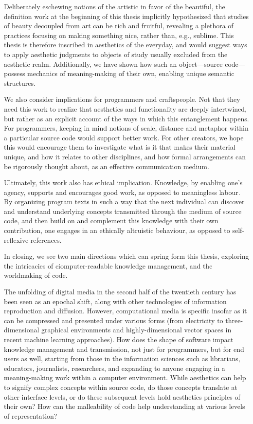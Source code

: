 Deliberately eschewing notions of the artistic in favor of the beautiful, the definition work at the beginning of this thesis implicitly hypothesized that studies of beauty decoupled from art can be rich and fruitful, revealing a plethora of practices focusing on making something nice, rather than, e.g., sublime. This thesis is therefore inscribed in aesthetics of the everyday, and would suggest ways to apply aesthetic judgments to objects of study usually excluded from the aesthetic realm. Additionally, we have shown how such an object—source code—possess mechanics of meaning-making of their own, enabling unique semantic structures.

We also consider implications for programmers and craftspeople. Not that they need this work to realize that aesthetics and functionality are deeply intertwined, but rather as an explicit account of the ways in which this entanglement happens. For programmers, keeping in mind notions of scale, distance and metaphor within a particular source code would support better work. For other creators, we hope this would encourage them to investigate what is it that makes their material unique, and how it relates to other disciplines, and how formal arrangements  can be rigorously thought about, as an effective communication medium.

Ultimately, this work also has ethical implication. Knowledge, by enabling one's agency, supports and encourages good work, as opposed to meaningless labour. By organizing program texts in such a way that the next individual can discover and understand underlying concepts transmitted through the medium of source code, and then build on and complement this knowledge with their own contribution, one engages in an ethically altruistic behaviour, as opposed to self-reflexive references.

\spacer

In closing, we see two main directions which can spring form this thesis, exploring the intricacies of ciomputer-readable knowledge management, and the worldmaking of code.

The unfolding of digital media in the second half of the twentieth century has been seen as an epochal shift, along with other technologies of information reproduction and diffusion. However, computational media is specific insofar as it can be compressed and presented under various forms (from electricity to three-dimensional graphical environments and highly-dimensional vector spaces in recent machine learning approaches). How does the shape of software impact knowledge management and transmission, not just for programmers, but for end users as well, starting from those in the information sciences such as librarians, educators, journalists, researchers, and expanding to anyone engaging in a meaning-making work within a computer environment. While aesthetics can help to signify complex concepts within source code, do those concepts translate at other interface levels, or do these subsequent levels hold aesthetics principles of their own? How can the malleability of code help understanding at various levels of representation?


